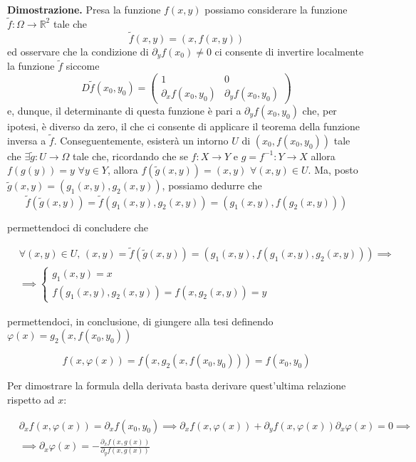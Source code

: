 \noindent \textbf{Dimostrazione. }
Presa la funzione $f(x,y)$ possiamo considerare la funzione $\tilde{f}:\Omega \to \mathbb{R}^2$ tale che
$$
\tilde{f}(x, y)=(x, f(x, y))
$$
ed osservare che la condizione di $\partial_y f(x_0) \neq 0$ ci consente di invertire localmente la funzione $\tilde{f}$ siccome
$$
D\tilde{f}(x_0, y_0) = \begin{pmatrix}
1 & 0 \\
\partial_x f(x_0, y_0) & \partial_y f(x_0, y_0)
\end{pmatrix}
$$
e, dunque, il determinante di questa funzione è pari a $\partial_y f(x_0, y_0)$ che, per ipotesi, è diverso da zero, il che ci consente di applicare il teorema della funzione inversa a $\tilde{f}$. Conseguentemente, esisterà un intorno $U$ di $(x_0, f(x_0, y_0))$ tale che $\exists \tilde{g}: U \to \Omega$ tale che, ricordando che se $f: X \to Y$ e $g=f^{-1}: Y \to X$ allora $f(g(y))=y \, \, \forall y \in Y$,  allora $f(\tilde{g}(x, y)) = (x, y) \, \, \forall (x, y) \in U$. Ma, posto $\tilde{g}(x,y)=(g_1(x, y), g_2(x, y))$, possiamo dedurre che
$$
\tilde{f}(\tilde{g}(x, y)) = \tilde{f}(g_1(x, y), g_2(x,y)) = (g_1(x, y), f(g_2(x, y)))
$$

permettendoci di concludere che

\begin{align*}
&\forall (x, y) \in U, \, (x, y) = \tilde{f}(\tilde{g}(x, y)) = (g_1(x, y), f(g_1(x, y), g_2(x, y))) \implies \\
&\implies \begin{cases}
g_1(x, y) = x \\
f(g_1(x,y), g_2(x,y)) = f(x, g_2(x, y)) = y
\end{cases}
\end{align*}

permettendoci, in conclusione, di giungere alla tesi definendo $\varphi(x) = g_2(x, f(x_0, y_0))$

$$
f(x, \varphi(x)) = f(x, g_2(x, f(x_0, y_0))) = f(x_0, y_0)
$$

Per dimostrare la formula della derivata basta derivare quest'ultima relazione rispetto ad $x$:

\begin{align*}
&\partial_x f(x, \varphi(x)) = \partial_x f(x_0, y_0) \implies \partial_x f(x, \varphi(x)) + \partial_y f(x, \varphi(x)) \partial_x \varphi(x) = 0 \implies \\
&\implies \partial_x \varphi(x) = - \frac{\partial_x f(x, g(x))}{\partial_y f(x, g(x))}
\end{align*}

